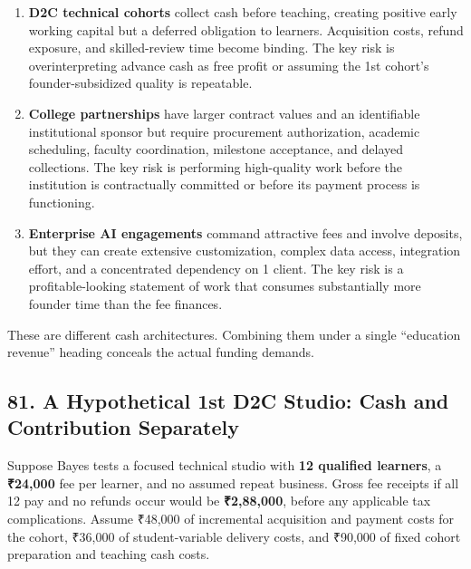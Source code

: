 \begin{enumerate}
\item \textbf{D2C technical cohorts} collect cash before teaching, creating positive early working capital but a deferred obligation to learners. Acquisition costs, refund exposure, and skilled-review time become binding. The key risk is overinterpreting advance cash as free profit or assuming the 1st cohort's founder-subsidized quality is repeatable.
\item \textbf{College partnerships} have larger contract values and an identifiable institutional sponsor but require procurement authorization, academic scheduling, faculty coordination, milestone acceptance, and delayed collections. The key risk is performing high-quality work before the institution is contractually committed or before its payment process is functioning.
\item \textbf{Enterprise AI engagements} command attractive fees and involve deposits, but they can create extensive customization, complex data access, integration effort, and a concentrated dependency on 1 client. The key risk is a profitable-looking statement of work that consumes substantially more founder time than the fee finances.
\end{enumerate}

These are different cash architectures. Combining them under a single ``education revenue'' heading conceals the actual funding demands.

\subsection*{81. A Hypothetical 1st D2C Studio: Cash and Contribution Separately}

Suppose Bayes tests a focused technical studio with \textbf{12 qualified learners}, a \textbf{₹24,000} fee per learner, and no assumed repeat business. Gross fee receipts if all 12 pay and no refunds occur would be \textbf{₹2,88,000}, before any applicable tax complications. Assume ₹48,000 of incremental acquisition and payment costs for the cohort, ₹36,000 of student-variable delivery costs, and ₹90,000 of fixed cohort preparation and teaching cash costs.


